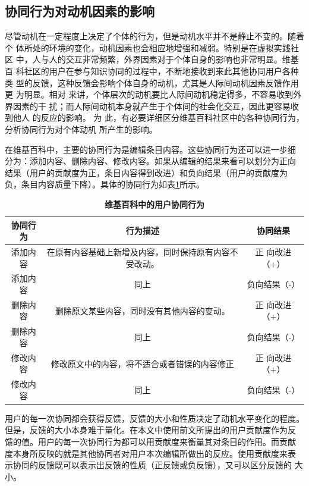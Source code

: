 \subsection{协同行为对动机因素的影响}
 
尽管动机在一定程度上决定了个体的行为，但是动机水平并不是静止不变的。随着个
体所处的环境的变化，动机因素也会相应地增强和减弱。特别是在虚拟实践社区
中，人与人的交互非常频繁，外界因素对于个体自身的影响也非常明显。维基百
科社区的用户在参与知识协同的过程中，不断地接收到来此其他协同用户各种类
型的反馈，这种反馈会影响个体自身的动机，尤其是人际间动机因素反馈作用更
为明显。相对
来讲，个体层次的动机要比人际间动机稳定得多，不容易收到外界因素的干
扰；而人际间动机本身就产生于个体间的社会化交互，因此更容易收到他人
的反应的影响。
为
此，有必要详细区分维基百科社区中的各种协同行为，分析协同行为对个体动机
所产生的影响。

在维基百科中，主要的协同行为是编辑条目内容。这些协同行为还可以进一步细
分为：添加内容、删除内容、修改内容。如果从编辑的结果来看可以划分为正向
结果（用户的贡献度为正，条目内容得到改进）和负向结果（用户的贡献度为
负，条目内容质量下降）。具体的协同行为如表\ref{tab:collaboration-activities}所示。
\begin{table}[htb]
  \centering
 \small
  \caption{\small{\textbf{维基百科中的用户协同行为}}}
  \begin{tabular}{|c|c|c|}

\hline
    协同行为&行为描述&协同结果\\\hline
    添加内容&在原有内容基础上新增及内容，同时保持原有内容不受改动。&正
    向改进（+）\\\hline
    添加内容&同上&负向结果（-）\\\hline
    删除内容&删除原文某些内容，同时没有其他内容的变动。&正
    向改进（+）\\\hline
    删除内容&同上&负向结果（-）\\\hline
    修改内容&修改原文中的内容，将不适合或者错误的内容修正&正
    向改进（+）\\\hline
    修改内容&同上&负向结果（-）\\\hline
     \end{tabular}

  \label{tab:collaboration-activities}
\end{table}

用户的每一次协同都会获得反馈，反馈的大小和性质决定了动机水平变化的程度。
但是，反馈的大小本身难于量化。在本文中使用前文所提出的用户贡献度作为反
馈的值。用户的每一次协同行为都可以用贡献度来衡量其对条目的作用。而贡献
度本身所反映的就是其他协同者对用户本次编辑所做出的反应。使用贡献度来表
示协同的反馈既可以表示出反馈的性质（正反馈或负反馈），又可以区分反馈的
大小。

